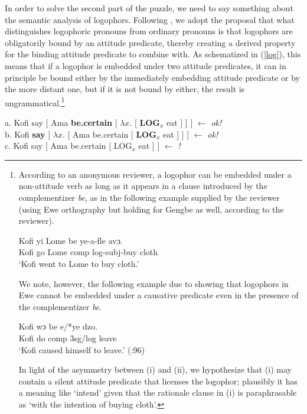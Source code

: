 \documentclass[output=paper
,modfonts
,nonflat]{langsci/langscibook}
\newcommand{\á}{\'{ã}}
\newcommand{\É}{\'{\~{ε}}}
\newcommand{\È}{\`{\~{ε}}}
\newcommand{\í}{\'{\~{i}}}
\newcommand{\ì}{\`{\~{i}}}
\renewcommand{\O}{ɔ}
\newcommand{\Ó}{\'{\~{ɔ}}}
\newcommand{\Ò}{\`{\~{ɔ}}}
\newcommand{\ú}{\'{ũ}}
\newcommand{\ù}{\`{ũ}}
\begin{document}
In order to solve the second part of the puzzle, we need to say something about the semantic analysis of logophors. Following \cite{heim02, vs02, vs03, pearson15}, we adopt the proposal that what distinguishes logophoric pronouns from ordinary pronouns is that logophors are obligatorily bound by an attitude predicate, thereby creating a derived property for the binding attitude predicate to combine with. As schematized in (\ref{log}), this means that  if a logophor is embedded under two attitude predicates, it can in principle be bound either by the immediately embedding attitude predicate or by the more distant one, but if it is not bound by either, the result is ungrammatical.\footnote{According to an anonymous reviewer, a logophor can be embedded under a non-attitude verb as long as it appears in a clause introduced by the complementizer {\em be}, as in the following example supplied by the reviewer (using Ewe orthography but holding for Gengbe as well, according to the reviewer).


\ea
\gll Kofi yi Lome be ye-a-ƒle av{\O}.\\
Kofi go Lome {\sc comp} {\sc log}-{\sc subj}-buy cloth\\
\glt `Kofi went to Lome to buy cloth.'
\z

We note, however, the following example due to \cite{pearson15} showing that logophors in Ewe cannot be embedded under a causative predicate even in the presence of the complementizer {\em be}. 

\ea
\gll Kofi w{\O} be e/*ye dzo.\\
Kofi do {\sc comp} 3{\sc sg}/{\sc log} leave\\
\glt `Kofi caused himself to leave.' (\citealt{pearson15}:96)
\z

In light of the asymmetry between (i) and (ii), we hypothesize that (i) may contain a silent attitude predicate that licenses the logophor; plausibly it has a meaning like `intend' given that the rationale clause in (i) is paraphrasable as `with the intention of buying cloth'.

}


\ea
a. Kofi say [ Ama {\bf be.certain} [ $\lambda x$. [ {\bf LOG}$_{x}$ eat ] ] ] \hfill $\leftarrow$ {\em ok!}\\
b. Kofi {\bf say} [ $\lambda x$. [ Ama be.certain  [ {\bf LOG}$_{x}$ eat ] ] ] \hfill $\leftarrow$ {\em ok!} \\
c. Kofi say  [ Ama be.certain  [ LOG$_{x}$ eat ] ] \hfill $\leftarrow$ {\em *!} \label{log}
\z
\end{document}
